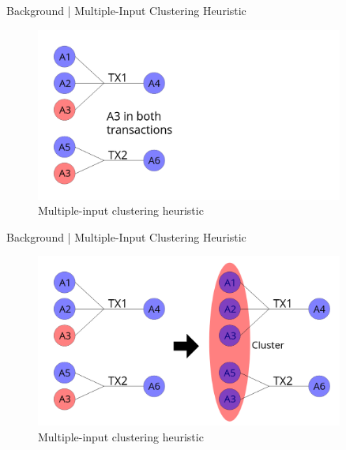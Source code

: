 \documentclass[10pt]{beamer}
\begin{document}
\begin{frame}[fragile]{Background | Multiple-Input Clustering Heuristic}
    \begin{figure}
        \centering
        \includegraphics[width=0.9\textwidth]{images/clustering2.png}
        \\Multiple-input clustering heuristic
    \end{figure}
\end{frame}

\begin{frame}[fragile]{Background | Multiple-Input Clustering Heuristic}
    \begin{figure}
        \centering
        \includegraphics[width=0.9\textwidth]{images/clustering3.png}
        \\Multiple-input clustering heuristic
    \end{figure}
\end{frame}
\end{document}
